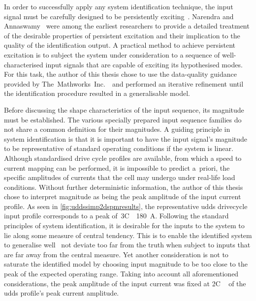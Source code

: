 
In order  to successfully apply  any system identification technique,  the input
signal must be carefully  designed to be persistently exciting~\cite{Ljung1999}.
Narendra and Annaswamy~\cite{Narendra1984,Narendra1987}  were among the earliest
researchers  to provide  a detailed  treatment  of the  desirable properties  of
persistent excitation and their implication to the quality of the identification
output. A  practical method to achieve  persistent excitation is to  subject the
system under  consideration to  a sequence  of well-characterised  input signals
that  are  capable of  exciting  its  hypothesised  modes.  For this  task,  the
author  of this  thesis  chose  to use  the  data-quality  guidance provided  by
The~Mathworks~Inc.~\cite{mathworkssysid}\ and performed  an iterative refinement
until the identification procedure resulted in a generalisable model.

Before discussing the shape characteristics of the input sequence, its magnitude
must be established.  The various specially prepared input  sequence families do
not  share a  common definition  for their  magnitudes. A  guiding principle  in
system  identification is  that  it  is important  to  have  the input  signal's
magnitude  to  be  representative  of standard  operating  conditions if the
system is linear.  Although standardised  drive  cycle  profiles  are
available,  from  which  a  speed  to current mapping  can be  performed, it  is
impossible  to predict  a~priori, the specific  amplitudes of  currents  that
the cell  may  undergo under  real-life load  conditions.  Without  further
deterministic information,  the  author  of this  thesis  chose to  interpret
magnitude  as  being  the peak  amplitude  of the  input  current profile.  As
seen  in \cref{fig:uddssimp2dspmresults},  the representative  \gls{udds}
drivecycle  input  profile  corresponds  to  a  peak
of~3C~\ie~\SI{180}{\ampere}.  Following   the  standard  principles   of  system
identification, it is desirable  for the inputs to the system  to lie along some
measure  of  central tendency.  This  is  to  enable  the identified  system  to
generalise well  \ie~not deviate too far  from the truth when  subject to inputs
that are far away from the central  measure. Yet another consideration is not to
saturate the identified model by choosing input magnitude to be too close to the
peak of  the expected  operating range. Taking  into account  all aforementioned
considerations,  the  peak amplitude  of  the  input  current  was fixed  at  2C
\ie~ of the \gls{udds} profile's peak current amplitude.

